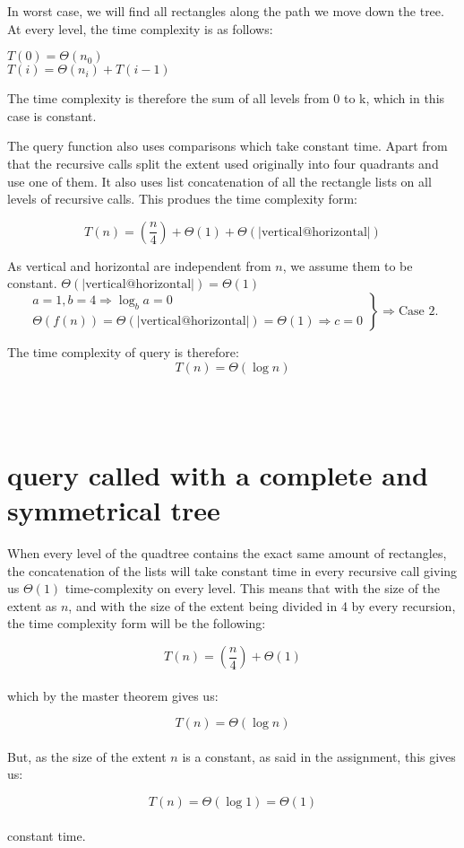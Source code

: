 \documentclass[12pt, a4paper]{article}
\begin{document}
In worst case, we will find all rectangles along the path we move down the tree. At every level, the time complexity is as follows: 

$T(0)= \Theta(n_0)$\\
$T(i)= \Theta(n_i) + T(i-1)$

The time complexity is therefore the sum of all levels from 0 to k, which in this case is constant.



The query function also uses comparisons which take constant time. Apart from that the recursive calls split the extent used originally into four quadrants and use one of them. It also uses list concatenation of all the rectangle lists on all levels of recursive calls. This produes the time complexity form:

$$T(n)=\left(\frac{n}{4}\right)+\Theta(1)+\Theta(|\text{vertical@horizontal}|)$$

As vertical and horizontal are independent from $n$, we assume them to be constant. $\Theta(|\text{vertical@horizontal}|) = \Theta(1)$\\

\[
\left.
\begin{array}{l}
  a=1, b=4 \Rightarrow \log_ba = 0 \\
  \Theta(f(n)) = \Theta(|\text{vertical@horizontal}|) = \Theta(1) \Rightarrow c = 0
\end{array} \right\} \Rightarrow \text{Case 2.}
\]

The time complexity of query is therefore: $$T(n)=\Theta(\log n)$$

\\
\\
\section{query called with a complete and symmetrical tree}

When every level of the quadtree contains the exact same amount of rectangles, the concatenation of the lists will take constant time in every recursive call giving us $\Theta(1)$ time-complexity on every level. This means that with the size of the extent as $n$, and with the size of the extent being divided in 4 by every recursion, the time complexity form will be the following:

 $$T(n)=\left(\frac{n}{4}\right)+\Theta(1)$$\\

which by the master theorem gives us:

 $$T(n)=\Theta(\log n)$$\\

But, as the size of the extent $n$ is a constant, as said in the assignment, this gives us:

 $$T(n)=\Theta(\log 1)=\Theta(1)$$\\

constant time.
\end{document}
